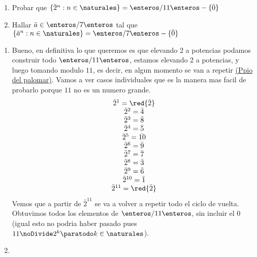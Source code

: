 \begin{enunciado}{\ejercicio}
    \begin{enumerate}[label = \roman*)]
        \item Probar que $\{\bar{2}^n : n \in \naturales\} = \enteros/11\enteros - \{\bar{0}\}$
        \item Hallar $\bar{a} \in \enteros/7\enteros$ tal que $\{\bar{a}^n : n \in \naturales\} = \enteros/7\enteros - \{\bar{0}\}$
    \end{enumerate}
\end{enunciado}

\begin{enumerate}[label = \roman*)]
    \item    
    Bueno, en definitiva lo que queremos es que elevando 2 a potencias podamos construir todo $\enteros/11\enteros$,
    estamos elevando 2 a potencias, y luego tomando modulo $11$, es decir, en algun momento se van a repetir \href{https://es.wikipedia.org/wiki/Principio_del_palomar}{(Ppio del palomar)}. 
    Vamos a ver casos individuales que es la manera mas facil de probarlo porque $11$ no es un numero grande. 
    $$
    \begin{array}{c}
     \bar{2}^1  = \red{\bar{2}} \\
     \bar{2}^2  = \bar{4} \\
     \bar{2}^3  = \bar{8} \\
     \bar{2}^4  = \bar{5} \\
     \bar{2}^5  = \bar{10} \\
     \bar{2}^6  = \bar{9} \\
     \bar{2}^7  = \bar{7} \\
     \bar{2}^8  = \bar{3} \\
     \bar{2}^9  = \bar{6} \\
     \bar{2}^{10} = \bar{1} \\
     \bar{2}^{11} = \red{\bar{2}} \\
    \end{array}
    $$
    Vemos que a partir de $\bar{2}^{11}$ se va a volver a repetir todo el ciclo de vuelta.
    Obtuvimos todos los elementos de $\enteros/11\enteros$, sin incluir el 0 (igual esto no podria haber pasado pues $11 \noDivide 2^k \paratodo k \in \naturales$). 
    \item \hacer

\end{enumerate}

\begin{aportes}
    \item {}
\end{aportes}
